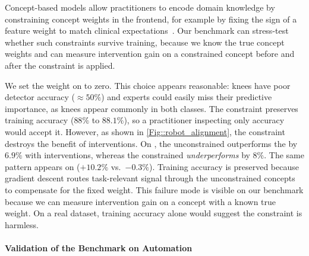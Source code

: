 \documentclass[11pt]{article}
\begin{document}
Concept-based models allow practitioners to encode domain knowledge by constraining concept weights in the frontend, for example by fixing the sign of a feature weight to match clinical expectations~\citep{joseph2025cognitive, adler2022meeting}. Our benchmark can stress-test whether such constraints survive training, because we know the true concept weights and can measure intervention gain on a constrained concept before and after the constraint is applied.

We set the weight on  to zero. This choice appears reasonable: knees have poor detector accuracy ($\approx 50\%$) and experts could easily miss their predictive importance, as knees appear commonly in both classes. The constraint preserves training accuracy ($88\%$ to $88.1\%$), so a practitioner inspecting only accuracy would accept it. However, as shown in \cref{Fig::robot_alignment}, the constraint destroys the benefit of interventions. On , the unconstrained \CBM{} outperforms the \DNN{} by $6.9\%$ with interventions, whereas the constrained \CBM{} \emph{underperforms} by $8\%$. The same pattern appears on  ($+10.2\%$ vs.\ $-0.3\%$). Training accuracy is preserved because gradient descent routes task-relevant signal through the unconstrained concepts to compensate for the fixed weight. This failure mode is visible on our benchmark because we can measure intervention gain on a concept with a known true weight. On a real dataset, training accuracy alone would suggest the constraint is harmless.


\paragraph{Validation of the Benchmark on Automation}
\label{Sec::AutomationValidation}

\begin{table}
    \centering
    \resizebox{0.49\textwidth}{!}{
    \small
    
    }
    \caption{$\textsf{SelectiveAccuracy}$, $\textsf{NetWorkAutomated}$, and $\textsf{Coverage}$ on a real-world  checklist task and on our synthetic  benchmark. The architecture ranking changes across datasets. \CEM{} leads on  ($73.0\%$), while \CBM{} leads on  ($59.0\%$) and \ProbCBM{} falls to $1.0\%$. Because  has a known labeling rule, it lets us probe architecture-level explanations that are hard to isolate on .}
    \label{Table::sudoku}
\end{table}
\end{document}
